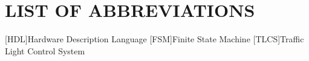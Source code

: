\documentclass[12pt,a4paper]{article}
\begin{document}
\section*{\centering{}LIST OF ABBREVIATIONS}
\begin{acronym}[TLCS]\itemsep0pt
	[HDL]{Hardware Description Language}
	[FSM]{Finite State Machine}
	[TLCS]{Traffic Light Control System}
\end{acronym}

\clearpage
\fancyhead[L]{\footnotesize\slshape\nouppercase\leftmark}
\onehalfspacing{}
\clearpage

\clearpage

\clearpage

\clearpage

\clearpage

\clearpage

\clearpage


\clearpage
{}
\begin{flushleft}
	\singlespacing{}
	\setlength{\bibitemsep}{\baselineskip}
	\renewcommand{\refname}{\centering{}REFERENCES}
	\printbibliography{}
\end{flushleft}
\end{document}
